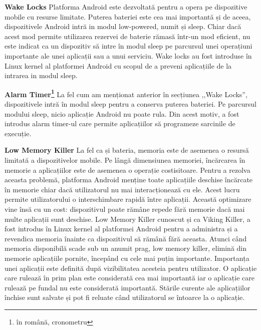 \textbf{Wake Locks}\newline
Platforma Android este dezvoltată pentru a opera pe dispozitive mobile cu resurse limitate. Puterea bateriei este cea mai importantă și de aceea, dispozitivele Android intră in modul low-powered, numit și sleep. Chiar dacă acest mod permite utilizarea rezervei de baterie rămasă într-un mod eficient, nu este indicat ca un dispozitiv să intre în modul sleep pe parcursul unei operațiuni importante ale unei aplicații sau a unui serviciu.\newline
 Wake locks au fost introduse în Linux kernel al platformei Android cu scopul de a preveni aplicațiile de la intrarea in modul sleep.\cite{2}\newline

\textbf{Alarm Timer\footnote{în română, cronometru}}\newline
La fel cum am menționat anterior în secțiunea ,,Wake Locks'', dispozitivele intră în modul sleep pentru a conserva puterea bateriei. Pe parcursul modului sleep, nicio aplicație Android nu poate rula. Din acest motiv, a fost introdus alarm timer-ul care permite aplicațiilor să programeze sarcinile de execuție. \cite{2}\newline

\textbf{Low Memory Killer}\newline
La fel ca și bateria, memoria este de asemenea o resursă limitată a dispozitivelor mobile. Pe lângă dimensiunea memoriei, încărcarea în memorie a aplicațiilor este de asemenea o operație costisitoare. Pentru a rezolva aceasta problemă, platforma Android menține toate aplicațiile deschise încărcate în memorie chiar dacă utilizatorul nu mai interacționează cu ele.\newline
 Acest lucru permite utilizatorului o interschimbare rapidă între aplicații.\newline
 Această optimizare vine însă cu un cost: dispozitivul poate rămâne repede fără memorie dacă mai multe aplicații sunt deschise. \newline
 Low Memory Killer cunoscut și ca Viking Killer, a fost introdus în Linux kernel al platformei Android pentru a administra și a revendica memoria înainte ca dispozitivul să rămână fără aceasta.\newline
 Atunci când memoria disponibilă scade sub un anumit prag, low memory killer, elimină din memorie aplicațiile pornite, începând cu cele mai puțin importante.\newline
 Importanța unei aplicații este definită după vizibilitatea acesteia pentru utilizator.\newline
 O aplicație care rulează în prim plan este considerată cea mai importantă iar o aplicație care rulează pe fundal nu este considerată importantă. Stările curente ale aplicațiilor închise sunt salvate și pot fi reluate când utilizatorul se întoarce la o aplicație.\cite{2}\newline



